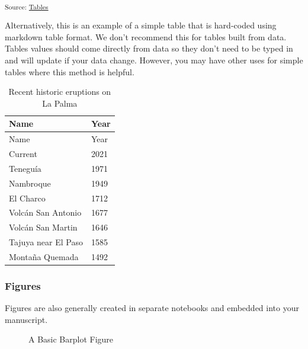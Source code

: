 \documentclass[
]{agujournal2019}
\begin{document}
\textsubscript{Source:
\href{https://jjcurtin.github.io/study_template/notebooks/tables-preview.html\#cell-table-1}{Tables}}

Alternatively, this is an example of a simple table that is hard-coded
using markdown table format. We don't recommend this for tables built
from data. Tables values should come directly from data so they don't
need to be typed in and will update if your data change. However, you
may have other uses for simple tables where this method is helpful.

\begin{longtable}[]{@{}ll@{}}
\caption{Recent historic eruptions on La
Palma}\label{tbl-history}\tabularnewline
\toprule\noalign{}
Name & Year \\
\midrule\noalign{}
\endfirsthead
\toprule\noalign{}
Name & Year \\
\midrule\noalign{}
\endhead
\bottomrule\noalign{}
\endlastfoot
Current & 2021 \\
Teneguía & 1971 \\
Nambroque & 1949 \\
El Charco & 1712 \\
Volcán San Antonio & 1677 \\
Volcán San Martin & 1646 \\
Tajuya near El Paso & 1585 \\
Montaña Quemada & 1492 \\
\end{longtable}

\subsubsection{Figures}\label{figures}

Figures are also generally created in separate notebooks and embedded
into your manuscript.

\begin{figure}[H]


\caption{\label{fig-1}A Basic Barplot Figure}

\end{figure}%
\end{document}
